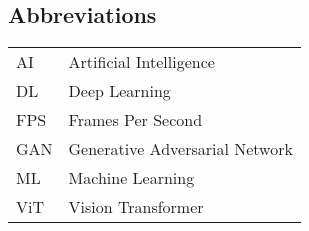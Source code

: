 \begin{center}
    \section*{Abbreviations}
    \begin{table}[h]
        \centering
        \begin{tabular}{ll}
            AI  & \hspace{2.3 in} Artificial Intelligence        \\
            DL  & \hspace{2.3 in} Deep Learning                  \\
            FPS & \hspace{2.3 in} Frames Per Second              \\
            GAN & \hspace{2.3 in} Generative Adversarial Network \\
            ML  & \hspace{2.3 in} Machine Learning               \\
            ViT & \hspace{2.3 in} Vision Transformer             \\
        \end{tabular}
    \end{table}
\end{center}

